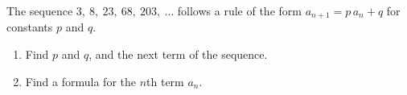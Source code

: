 The sequence $3,\ 8,\ 23,\ 68,\ 203,\ \dots$ follows a rule of the form $a_{n+1}=p\,a_n+q$ for constants $p$ and $q$.
\begin{enumerate}
\item[(a)] Find $p$ and $q$, and the next term of the sequence.
\item[(b)] Find a formula for the $n$th term $a_n$.
\end{enumerate}

